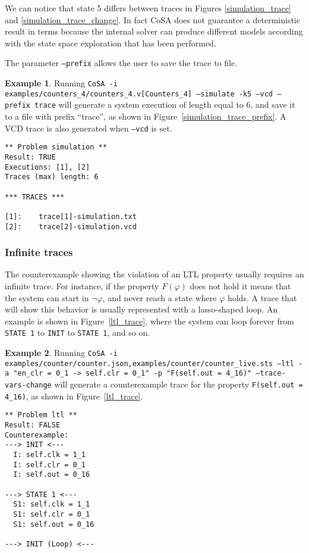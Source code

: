 \documentclass{article}
\theoremstyle{definition}
\newtheorem{example}{Example}[section]
\begin{document}
We can notice that state 5 differs between traces in Figures
\ref{simulation_trace} and \ref{simulation_trace_change}. In fact CoSA
does not guarantee a deterministic result in terms because the
internal solver can produce different models according with the state
space exploration that has been performed.

The parameter \texttt{--prefix} allows the user to save the trace to
file.

\begin{example}
  Running \texttt{CoSA -i
    examples/counters\_4/counters\_4.v[Counters\_4] --simulate -k5
    --vcd --prefix trace} will generate a system execution of length
  equal to 6, and save it to a file with prefix ``trace'', as shown in
  Figure~\ref{simulation_trace_prefix}. A VCD trace is also generated
  when \texttt{--vcd} is set.

\begin{lstlisting}[frame=single,language=ets,caption=Simulation Counter\_4 (with prefix),label=simulation_trace_prefix]
** Problem simulation **
Result: TRUE
Executions: [1], [2]
Traces (max) length: 6

*** TRACES ***

[1]:	trace[1]-simulation.txt
[2]:	trace[2]-simulation.vcd
\end{lstlisting}

\end{example}



\subsubsection{Infinite traces}

The counterexample showing the violation of an LTL property usually
requires an infinite trace. For instance, if the property $F(\varphi)$
does not hold it means that the system can start in $\neg \varphi$,
and never reach a state where $\varphi$ holds. A trace that will show
this behavior is usually represented with a lasso-shaped loop. An
example is shown in Figure~\ref{ltl_trace}, where the system can loop
forever from \texttt{STATE 1} to \texttt{INIT} to \texttt{STATE 1},
and so on.

\begin{example}
  Running \texttt{CoSA -i
    examples/counter/counter.json,examples/counter/counter\_live.sts
    --ltl -a "en\_clr = 0\_1 -> self.clr = 0\_1" -p "F(self.out =
    4\_16)" --trace-vars-change} will generate a counterexample trace
  for the property \texttt{F(self.out = 4\_16)}, as shown in
  Figure~\ref{ltl_trace}.

\begin{lstlisting}[frame=single,language=ets,caption=Simulation Counter\_4 (with changing values),label=ltl_trace]
** Problem ltl **
Result: FALSE
Counterexample:
---> INIT <---
  I: self.clk = 1_1
  I: self.clr = 0_1
  I: self.out = 0_16

---> STATE 1 <---
  S1: self.clk = 1_1
  S1: self.clr = 0_1
  S1: self.out = 0_16

---> INIT (Loop) <---
\end{lstlisting}

\end{example}
\end{document}
